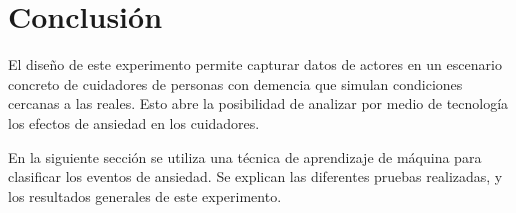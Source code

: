 \section{Conclusi\'on}
El dise\~no de este experimento permite capturar datos de actores en un escenario concreto de cuidadores de personas con demencia que simulan condiciones cercanas a las reales. Esto abre la posibilidad de analizar por medio de tecnolog\'ia los efectos de ansiedad en los cuidadores.

En la siguiente secci\'on se utiliza una t\'ecnica de aprendizaje de m\'aquina para clasificar los eventos de ansiedad. Se explican las diferentes pruebas realizadas, y los resultados generales de este experimento.
\newpage

